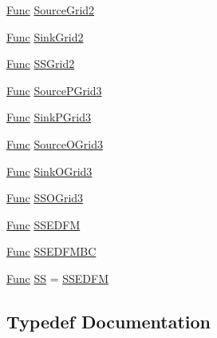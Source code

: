 \begin{DoxyCompactItemize}
\hyperlink{namespaceFVCode3D_a38fa3b2520ad364d2c3d56ea5077826a}{Func} \hyperlink{namespaceFVCode3D_a271b4cbc8ec56bd2a3cb950b307aef18}{Source\+Grid2}
\item 
\hyperlink{namespaceFVCode3D_a38fa3b2520ad364d2c3d56ea5077826a}{Func} \hyperlink{namespaceFVCode3D_a312f262aefa197b219228571b49620be}{Sink\+Grid2}
\item 
\hyperlink{namespaceFVCode3D_a38fa3b2520ad364d2c3d56ea5077826a}{Func} \hyperlink{namespaceFVCode3D_a4072861e3dbbfcd9e80417b32c6991be}{S\+S\+Grid2}
\item 
\hyperlink{namespaceFVCode3D_a38fa3b2520ad364d2c3d56ea5077826a}{Func} \hyperlink{namespaceFVCode3D_ae622d8dcaded68fd7f8d650f0a8d9f71}{Source\+P\+Grid3}
\item 
\hyperlink{namespaceFVCode3D_a38fa3b2520ad364d2c3d56ea5077826a}{Func} \hyperlink{namespaceFVCode3D_a8e5a12e6a9e22baa4378e82fdfcc7613}{Sink\+P\+Grid3}
\item 
\hyperlink{namespaceFVCode3D_a38fa3b2520ad364d2c3d56ea5077826a}{Func} \hyperlink{namespaceFVCode3D_ac7d83a03f6c58a7410364b917cf7ebc5}{Source\+O\+Grid3}
\item 
\hyperlink{namespaceFVCode3D_a38fa3b2520ad364d2c3d56ea5077826a}{Func} \hyperlink{namespaceFVCode3D_a1d325cbbfbdf5832333e0a07e6095053}{Sink\+O\+Grid3}
\item 
\hyperlink{namespaceFVCode3D_a38fa3b2520ad364d2c3d56ea5077826a}{Func} \hyperlink{namespaceFVCode3D_ad684cb0cef80af1bba8db353619ab1cf}{S\+S\+O\+Grid3}
\item 
\hyperlink{namespaceFVCode3D_a38fa3b2520ad364d2c3d56ea5077826a}{Func} \hyperlink{namespaceFVCode3D_a57e80824f085310d70ceed215314b9eb}{S\+S\+E\+D\+FM}
\item 
\hyperlink{namespaceFVCode3D_a38fa3b2520ad364d2c3d56ea5077826a}{Func} \hyperlink{namespaceFVCode3D_a84fa11f60a0d07f58d20dcd63837a333}{S\+S\+E\+D\+F\+M\+BC}
\item 
\hyperlink{namespaceFVCode3D_a38fa3b2520ad364d2c3d56ea5077826a}{Func} \hyperlink{namespaceFVCode3D_ae8b0f97f0774db9f0881cfc5f31d93f4}{SS} = \hyperlink{namespaceFVCode3D_a57e80824f085310d70ceed215314b9eb}{S\+S\+E\+D\+FM}
\end{DoxyCompactItemize}


\subsection{Typedef Documentation}
